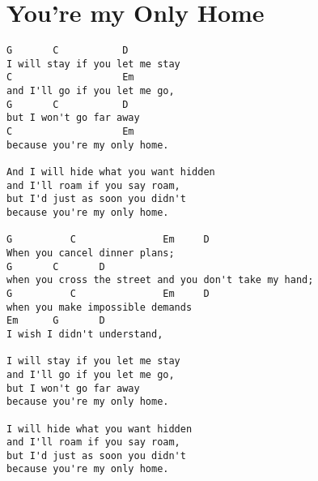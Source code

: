 \documentclass[leqno]{memoir}
\begin{document}
\chapter{You're my Only Home}
\begin{verbatim}
G       C           D
I will stay if you let me stay
C                   Em
and I'll go if you let me go,
G       C           D
but I won't go far away
C                   Em
because you're my only home.

And I will hide what you want hidden
and I'll roam if you say roam,
but I'd just as soon you didn't
because you're my only home.

G          C               Em     D 
When you cancel dinner plans;
G       C       D
when you cross the street and you don't take my hand;
G          C               Em     D 
when you make impossible demands
Em      G       D
I wish I didn't understand,

I will stay if you let me stay
and I'll go if you let me go,
but I won't go far away
because you're my only home.

I will hide what you want hidden
and I'll roam if you say roam,
but I'd just as soon you didn't
because you're my only home. 
\end{verbatim}
\newpage
\end{document}
